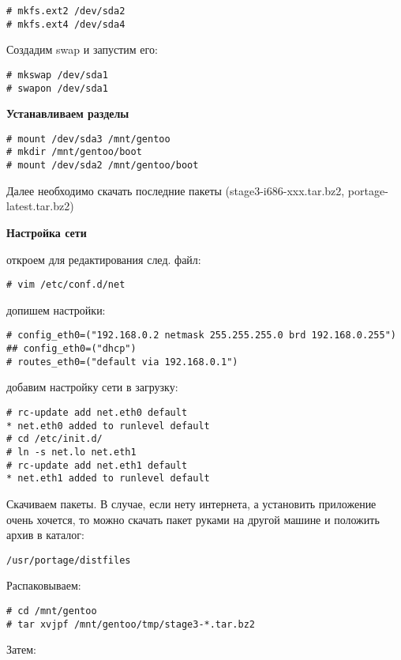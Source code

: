 \documentclass[12pt, a4paper]{article}
\begin{document}
\begin{verbatim}
# mkfs.ext2 /dev/sda2
# mkfs.ext4 /dev/sda4
\end{verbatim}

Создадим swap и запустим его:

\begin{verbatim}
# mkswap /dev/sda1
# swapon /dev/sda1
\end{verbatim}

{\bf Устанавливаем разделы}

\begin{verbatim}
# mount /dev/sda3 /mnt/gentoo
# mkdir /mnt/gentoo/boot
# mount /dev/sda2 /mnt/gentoo/boot
\end{verbatim}

Далее необходимо скачать последние пакеты (stage3-i686-xxx.tar.bz2, portage-latest.tar.bz2)

{\bf Настройка сети}

откроем для редактирования след. файл:

\begin{verbatim}
# vim /etc/conf.d/net
\end{verbatim}

допишем настройки:

\begin{verbatim}
# config_eth0=("192.168.0.2 netmask 255.255.255.0 brd 192.168.0.255")
## config_eth0=("dhcp")
# routes_eth0=("default via 192.168.0.1")
\end{verbatim}

добавим настройку сети в загрузку:

\begin{verbatim}
# rc-update add net.eth0 default
* net.eth0 added to runlevel default
# cd /etc/init.d/
# ln -s net.lo net.eth1
# rc-update add net.eth1 default
* net.eth1 added to runlevel default
\end{verbatim}

Скачиваем пакеты. 
В случае, если нету интернета, а установить приложение очень хочется, то можно скачать пакет руками на другой машине и положить архив в каталог:
\begin{verbatim}
/usr/portage/distfiles
\end{verbatim}

Распаковываем:

\begin{verbatim}
# cd /mnt/gentoo
# tar xvjpf /mnt/gentoo/tmp/stage3-*.tar.bz2
\end{verbatim}

Затем:
\end{document}
